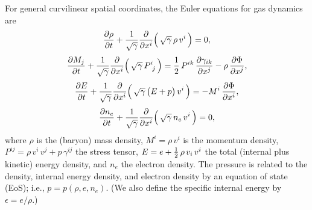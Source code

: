 \documentclass[10pt,preprint]{aastex}
\begin{document}
For general curvilinear spatial coordinates, the Euler equations for gas dynamics are \citep{leveque_2002}
\begin{equation}
  \frac{\partial \rho}{\partial t}
  +\frac{1}{\sqrt{\gamma}}\frac{\partial }{\partial x^{i}}\Big(\,\sqrt{\gamma}\,\rho\,v^{i}\,\Big)=0,
\end{equation}
\begin{equation}
  \frac{\partial M_{j}}{\partial t}
  +\frac{1}{\sqrt{\gamma}}\frac{\partial }{\partial x^{i}}\Big(\,\sqrt{\gamma}\,P^{i}_{~j}\,\Big)
  =\frac{1}{2}\,P^{ik}\,\frac{\partial \gamma_{ik}}{\partial x^{j}}-\rho\,\frac{\partial \Phi}{\partial x^{j}},
\end{equation}
\begin{equation}
  \frac{\partial E}{\partial t}
  +\frac{1}{\sqrt{\gamma}}\frac{\partial }{\partial x^{i}}\Big(\,\sqrt{\gamma}\,\big(E+p\big)\,v^{i}\,\Big)
  =-M^{i}\,\frac{\partial \Phi}{\partial x^{i}},
\end{equation}
\begin{equation}
  \frac{\partial n_{e}}{\partial t}
  +\frac{1}{\sqrt{\gamma}}\frac{\partial }{\partial x^{i}}\Big(\,\sqrt{\gamma}\,n_{e}\,v^{i}\,\Big)=0,
\end{equation}
where $\rho$ is the (baryon) mass density, $M^{i}=\rho\,v^{i}$ is the momentum density, $P^{ij}=\rho\,v^{i}\,v^{j}+p\,\gamma^{ij}$ the stress tensor, $E=e+\frac{1}{2}\,\rho\,v_{i}\,v^{i}$ the total (internal plus kinetic) energy density, and $n_{e}$ the electron density.  
The pressure is related to the density, internal energy density, and electron density by an equation of state (EoS); i.e., $p=p(\rho,e,n_{e})$.  
(We also define the specific internal energy by $\epsilon=e/\rho$.)
\end{document}
